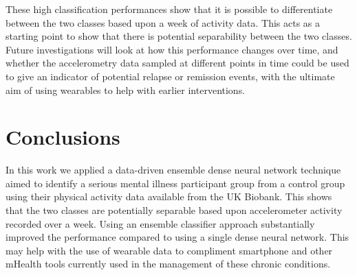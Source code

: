 \documentclass[letterpaper, 10pt, conference]{ieeeconf} %
\begin{document}
These high classification performances show that it is possible to differentiate between the two classes based upon a week of activity data. This acts as a starting point to show that there is potential separability between the two classes. Future investigations will look at how this performance changes over time, and whether the accelerometry data sampled at different points in time could be used to give an indicator of potential relapse or remission events, with the ultimate aim of using wearables to help with earlier interventions.



 
\section{Conclusions} \label{sec:conclusions}
In this work we applied a data-driven ensemble dense neural network technique aimed to identify a serious mental illness participant group from a control group using their physical activity data available from the UK Biobank. This shows that the two classes are potentially separable based upon accelerometer activity recorded over a week. Using an ensemble classifier approach substantially improved the performance compared to using a single dense neural network. This may help with the use of wearable data to compliment smartphone and other mHealth tools currently used in the management of these chronic conditions. 




\renewcommand*{\bibfont}{\small}
\printbibliography
\end{document}
